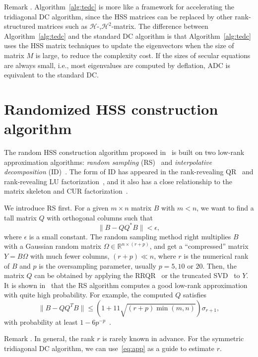 \documentclass[times]{nlaauth}
\newcounter{algorithm}
\newcounter{remark}
\newenvironment{remark}{\refstepcounter{remark}\vspace{1ex}
{\sc Remark \theremark.}\hspace{0.3em}\parindent=0pt}{\vspace{1ex}}
\begin{document}
\begin{remark}
Algorithm~\ref{alg:tedc} is more like a framework for accelerating the tridiagonal DC algorithm,
since the HSS matrices can be replaced by other rank-structured matrices such as $\mathcal{H}$-,$\mathcal{H}^2$-matrix.
The difference between Algorithm~\ref{alg:tedc} and the standard DC algorithm is that
Algorithm~\ref{alg:tedc} uses the HSS matrix techniques to update the eigenvectors when
the size of matrix $M$ is large, to reduce the complexity cost.
If the sizes of secular equations are always small, i.e., most eigenvalues are computed by deflation, ADC is equivalent to the standard DC.
\end{remark}


\section{Randomized HSS construction algorithm}

The random HSS construction algorithm proposed in~\cite{rand-hss} is built on two low-rank approximation algorithms:
\emph{random sampling} (RS)~\cite{Martinsson-Rev10,Martinsson-PNAS07}
and \emph{interpolative decomposition} (ID)~\cite{Cheng-Random,Martinsson-Harmon}.
The form of ID has appeared in the rank-revealing QR~\cite{Gu-RRQR} and rank-revealing LU factorization~\cite{Pan00}, and
it also has a close relationship to the matrix skeleton and CUR factorization~\cite{GTZ-ACA,Stewart-QR}.

We introduce RS first. For a given $m\times n$ matrix $B$ with $m < n$, we want to find a tall matrix
$Q$ with orthogonal columns such that
\[
\|B - QQ^* B\| < \epsilon,
\]
where $\epsilon$ is a small constant.
The random sampling method right multiplies $B$ with a Gaussian random matrix $\Omega \in \mathbb{R}^{n\times (r+p)}$,
and get a ``compressed'' matrix $Y=B\Omega$ with much fewer columns, $(r+p) \ll n$,
where $r$ is the numerical rank of $B$ and $p$ is the oversampling parameter, usually $p=5, 10$ or $20$.
Then, the matrix $Q$ can be obtained by applying the RRQR~\cite{Chan92,Gu-RRQR} or the truncated SVD~\cite{Golub-book2} to $Y$.
It is shown in~\cite{rand-hss,Martinsson-Rev10} that the RS algorithm computes a good low-rank
approximation with quite high probability. For example, the computed $Q$ satisfies
\[
\|B-QQ^TB\| \le \left( 1+11\sqrt{(r+p)\min(m,n)} \right)\sigma_{r+1},
\]
with probability at least $1-6p^{-p}$~\cite{rand-hss}.

\begin{remark}
In general, the rank $r$ is rarely known in advance. For the symmetric tridiagonal DC algorithm, we can
use~\eqref{eq:app} as a guide to estimate $r$.
\end{remark}
\end{document}
